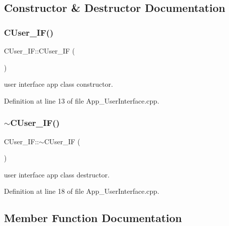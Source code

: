 \subsection{Constructor \& Destructor Documentation}
\mbox{\label{class_c_user___i_f_a417b492fc7368c7d5dde59587f4b3e65}} 
\subsubsection{\texorpdfstring{CUser\_IF()}{CUser\_IF()}}
{\footnotesize\ttfamily C\+User\+\_\+\+I\+F\+::\+C\+User\+\_\+\+IF (\begin{DoxyParamCaption}{ }\end{DoxyParamCaption})}



user interface app class constructor. 



Definition at line 13 of file App\+\_\+\+User\+Interface.\+cpp.

\mbox{\label{class_c_user___i_f_a35f3408f44d101a06e184311cab14cba}} 
\subsubsection{\texorpdfstring{$\sim$CUser\_IF()}{~CUser\_IF()}}
{\footnotesize\ttfamily C\+User\+\_\+\+I\+F\+::$\sim$\+C\+User\+\_\+\+IF (\begin{DoxyParamCaption}{ }\end{DoxyParamCaption})}



user interface app class destructor. 



Definition at line 18 of file App\+\_\+\+User\+Interface.\+cpp.



\subsection{Member Function Documentation}
\mbox{\label{class_c_user___i_f_a02c8bba754c77583dc5afaa6877dc547}} 
